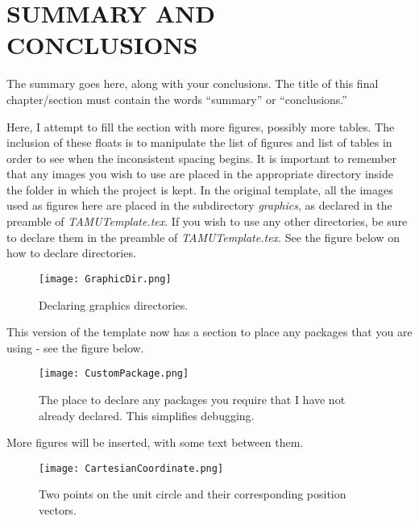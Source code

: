 %
%
%
%  
%



\chapter{SUMMARY AND CONCLUSIONS \label{cha:Summary}}

The summary goes here, along with your conclusions. The title of this final chapter/section must contain the words ``summary'' or ``conclusions.''

Here, I attempt to fill the section with more figures, possibly more tables. The inclusion of these floats is to manipulate the list of figures and list of tables in order to see when the inconsistent spacing begins. It is important to remember that any images you wish to use are placed in the appropriate directory inside the folder in which the project is kept. In the original template, all the images used as figures here are placed in the subdirectory \textit{graphics}, as declared in the preamble of \textit{TAMUTemplate.tex}. If you wish to use any other directories, be sure to declare them in the preamble of \textit{TAMUTemplate.tex}. See the figure below on how to declare directories.

\begin{figure}[h!]
	\centering
	\texttt{[image: GraphicDir.png]}
	\caption{Declaring graphics directories.}
\end{figure}

This version of the template now has a section to place any packages that you are using - see the figure below.

\begin{figure}[!h]
	\centering
	\texttt{[image: CustomPackage.png]}
	\caption{The place to declare any packages you require that I have not already declared. This simplifies debugging.}
\end{figure}

More figures will be inserted, with some text between them.

\begin{figure}[!h]
	\centering
	\texttt{[image: CartesianCoordinate.png]}
	\caption{Two points on the unit circle and their corresponding position vectors.}
\end{figure}

